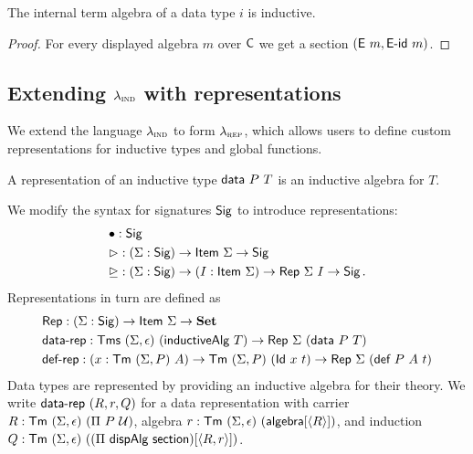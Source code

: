 \begin{lemma}
	The internal term algebra of a data type $i$ is inductive.
	\begin{proof}
		For every displayed algebra $m$ over $\textsf{C}$ we get a section $(\textsf{E}\ m, \textsf{E-id}\ m)$.
	\end{proof}
\end{lemma}


\subsection{Extending $\lambda_{\textsc{ind}}$ with representations} \label{sub:lambdarep}

We extend the language $\lambda_{\textsc{ind}}$ to form $\lambda_{\textsc{rep}}$, which allows users to
define custom representations for inductive types and global functions.

\begin{definition}
	A representation of an inductive type $\textsf{data}\ P\ T$ is an inductive algebra for $T$.
\end{definition}

We modify the syntax for signatures $\textsf{Sig}$ to introduce representations:
\begin{align*}
	 & \bullet : \Sig \\
	 & \rhd : (\Sigma : \Sig) \to \Item\ \Sigma \to \Sig \\
	 & \unrhd : (\Sigma : \Sig) \to (I : \Item\ \Sigma) \to \Rep\ \Sigma\ I \to \Sig \,.
\end{align*}
Representations in turn are defined as
\begin{align*}
& \Rep : (\Sigma : \Sig) \to \Item\ \Sigma \to \Set \\
& \mta{data-rep} : \Tms\ (\Sigma, \epsilon)\ (\mta{inductiveAlg}\ T) \to \Rep\ \Sigma\ (\mta{data}\ P\ T) \\
& \mta{def-rep} : (x : \Tm\ (\Sigma, P)\ A) \to \Tm\ (\Sigma, P)\ (\mta{Id}\ x\ t) \to \Rep\ \Sigma\ (\mta{def}\ P\ A\ t)
\end{align*}
Data types are represented by providing an inductive algebra for their theory.
We write $\textsf{data-rep}\ (R, r, Q)$ for a data representation with carrier $R :
\textsf{Tm}\ (\Sigma, \epsilon)\ (\Pi\ P\ \mathcal{U})$, algebra $r : \textsf{Tm}\ (\Sigma, \epsilon)\ (\textsf{algebra}[\langle R\rangle])$,
and induction $Q : \textsf{Tm}\ (\Sigma, \epsilon)\ ((\Pi\ \textsf{dispAlg}\ \textsf{section})[\langle R, r\rangle])$.

